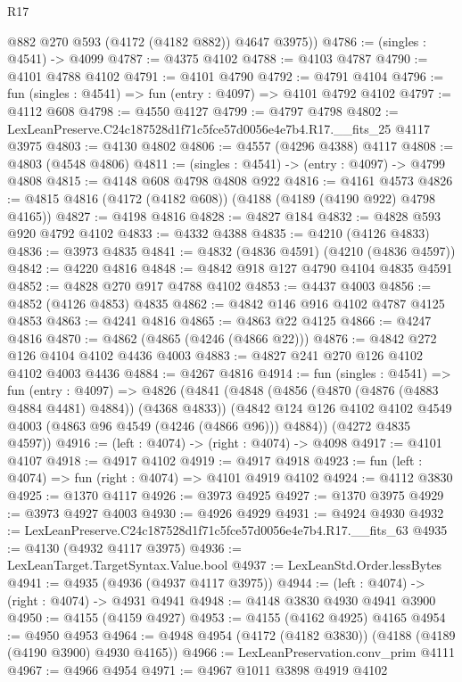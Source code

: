 \begin{lexlean}{R17}
\begin{coremodule}
        @882
        @270
        @593
        (@4172 (@4182 @882))
        @4647
        @3975))
@4786 := (singles : @4541) -> @4099
@4787 := @4375 @4102
@4788 := @4103 @4787
@4790 := @4101 @4788 @4102
@4791 := @4101 @4790
@4792 := @4791 @4104
@4796 := fun (singles : @4541) => fun (entry : @4097) => @4101 @4792 @4102
@4797 := @4112 @608
@4798 := @4550 @4127
@4799 := @4797 @4798
@4802 := LexLeanPreserve.C24c187528d1f71c5fce57d0056e4e7b4.R17.__fits_25 @4117 @3975
@4803 := @4130 @4802
@4806 := @4557 (@4296 @4388) @4117
@4808 := @4803 (@4548 @4806)
@4811 := (singles : @4541) -> (entry : @4097) -> @4799 @4808
@4815 := @4148 @608 @4798 @4808 @922
@4816 := @4161 @4573
@4826 := @4815 @4816 (@4172 (@4182 @608)) (@4188 (@4189 (@4190 @922) @4798 @4165))
@4827 := @4198 @4816
@4828 := @4827 @184
@4832 := @4828 @593 @920 @4792 @4102
@4833 := @4332 @4388
@4835 := @4210 (@4126 @4833)
@4836 := @3973 @4835
@4841 := @4832 (@4836 @4591) (@4210 (@4836 @4597))
@4842 := @4220 @4816
@4848 := @4842 @918 @127 @4790 @4104 @4835 @4591
@4852 := @4828 @270 @917 @4788 @4102
@4853 := @4437 @4003
@4856 := @4852 (@4126 @4853) @4835
@4862 := @4842 @146 @916 @4102 @4787 @4125 @4853
@4863 := @4241 @4816
@4865 := @4863 @22 @4125
@4866 := @4247 @4816
@4870 := @4862 (@4865 (@4246 (@4866 @22)))
@4876 := @4842 @272 @126 @4104 @4102 @4436 @4003
@4883 := @4827 @241 @270 @126 @4102 @4102 @4003 @4436
@4884 := @4267 @4816
@4914 := fun (singles : @4541) =>
  fun (entry : @4097) =>
  @4826
    (@4841
      (@4848
        (@4856 (@4870 (@4876 (@4883 @4884 @4481) @4884)) (@4368 @4833))
        (@4842 @124 @126 @4102 @4102 @4549 @4003 (@4863 @96 @4549 (@4246 (@4866 @96))) @4884))
      (@4272 @4835 @4597))
@4916 := (left : @4074) -> (right : @4074) -> @4098
@4917 := @4101 @4107
@4918 := @4917 @4102
@4919 := @4917 @4918
@4923 := fun (left : @4074) => fun (right : @4074) => @4101 @4919 @4102
@4924 := @4112 @3830
@4925 := @1370 @4117
@4926 := @3973 @4925
@4927 := @1370 @3975
@4929 := @3973 @4927 @4003
@4930 := @4926 @4929
@4931 := @4924 @4930
@4932 := LexLeanPreserve.C24c187528d1f71c5fce57d0056e4e7b4.R17.__fits_63
@4935 := @4130 (@4932 @4117 @3975)
@4936 := LexLeanTarget.TargetSyntax.Value.bool
@4937 := LexLeanStd.Order.lessBytes
@4941 := @4935 (@4936 (@4937 @4117 @3975))
@4944 := (left : @4074) -> (right : @4074) -> @4931 @4941
@4948 := @4148 @3830 @4930 @4941 @3900
@4950 := @4155 (@4159 @4927)
@4953 := @4155 (@4162 @4925) @4165
@4954 := @4950 @4953
@4964 := @4948 @4954 (@4172 (@4182 @3830)) (@4188 (@4189 (@4190 @3900) @4930 @4165))
@4966 := LexLeanPreservation.conv_prim @4111
@4967 := @4966 @4954
@4971 := @4967 @1011 @3898 @4919 @4102

\end{coremodule}
\end{lexlean}
